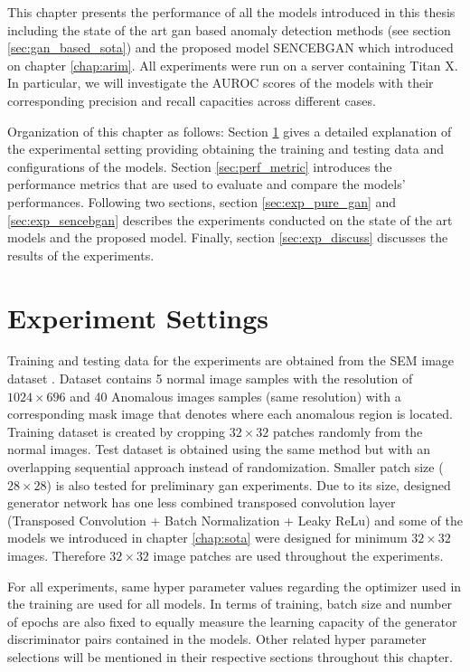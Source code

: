 
\begingroup

This chapter presents the performance of all the models introduced in this thesis including 
the state of the art gan based anomaly detection methods (see section \ref{sec:gan_based_sota}) and 
the proposed model SENCEBGAN which introduced on chapter \ref{chap:arim}. All experiments were run on 
a server containing Titan X. In particular, we will investigate the AUROC scores of the models with their 
corresponding precision and recall capacities across different cases. 

Organization of this chapter as follows: Section \ref{sec:exp_settings} gives a detailed explanation 
of the experimental setting providing obtaining the training and testing data and configurations of 
the models. Section \ref{sec:perf_metric} introduces the performance metrics that are used to evaluate 
and compare the models' performances. Following two sections, section \ref{sec:exp_pure_gan} and 
\ref{sec:exp_sencebgan} describes the experiments conducted on the state of the art models and the 
proposed model. Finally, section \ref{sec:exp_discuss} discusses the results of the experiments.

\section{Experiment Settings}
\label{sec:exp_settings}
Training and testing data for the experiments are obtained from the SEM image dataset \cite{sem}. 
Dataset contains 5 normal image samples with the resolution of $1024 \times 696$ and 40 Anomalous 
images samples (same resolution) with a corresponding mask image that denotes where each anomalous 
region is located. Training dataset is created by cropping $32 \times 32$ patches randomly from 
the normal images. Test dataset is obtained using the same method but with an overlapping sequential 
approach instead of randomization. Smaller patch size ($28 \times 28$) is also tested for preliminary 
gan experiments. Due to its size, designed generator network has one less combined transposed 
convolution layer (Transposed Convolution + Batch Normalization + Leaky ReLu) and some of the models 
we introduced in chapter \ref{chap:sota} were designed for minimum $32 \times 32$ images. Therefore 
$32 \times 32$ image patches are used throughout the experiments.
 
For all experiments, same hyper parameter values regarding the optimizer used in the training are used 
for all models. In terms of training, batch size and number of epochs are also fixed to equally 
measure the learning capacity of the generator discriminator pairs contained in the models. Other 
related hyper parameter selections will be mentioned in their respective sections throughout this chapter.

